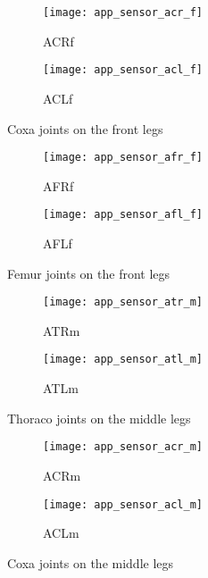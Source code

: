 \begin{figure}[H]
\centering
\begin{subfigure}{0.48\textwidth}
  \centering
  \texttt{[image: app\_sensor\_acr\_f]}
  \caption{ACRf}
  \label{fig:app_acr_f}
\end{subfigure}
\begin{subfigure}{0.48\textwidth}
  \centering
  \texttt{[image: app\_sensor\_acl\_f]}
  \caption{ACLf}
  \label{fig:app_acl_f}
\end{subfigure}
\caption{Coxa joints on the front legs}
\label{fig:app_ac_f}
\end{figure}

\begin{figure}[H]
\centering
\begin{subfigure}{0.48\textwidth}
  \centering
  \texttt{[image: app\_sensor\_afr\_f]}
  \caption{AFRf}
  \label{fig:app_afr_f}
\end{subfigure}
\begin{subfigure}{0.48\textwidth}
  \centering
  \texttt{[image: app\_sensor\_afl\_f]}
  \caption{AFLf}
  \label{fig:app_afl_f}
\end{subfigure}
\caption{Femur joints on the front legs}
\label{fig:app_af_f}
\end{figure}

\begin{figure}[H]
\centering
\begin{subfigure}{0.48\textwidth}
  \centering
  \texttt{[image: app\_sensor\_atr\_m]}
  \caption{ATRm}
  \label{fig:app_atr_m}
\end{subfigure}
\begin{subfigure}{0.48\textwidth}
  \centering
  \texttt{[image: app\_sensor\_atl\_m]}
  \caption{ATLm}
  \label{fig:app_atl_m}
\end{subfigure}
\caption{Thoraco joints on the middle legs}
\label{fig:app_at_m}
\end{figure}

\begin{figure}[H]
\centering
\begin{subfigure}{0.48\textwidth}
  \centering
  \texttt{[image: app\_sensor\_acr\_m]}
  \caption{ACRm}
  \label{fig:app_acr_m}
\end{subfigure}
\begin{subfigure}{0.48\textwidth}
  \centering
  \texttt{[image: app\_sensor\_acl\_m]}
  \caption{ACLm}
  \label{fig:app_acl_m}
\end{subfigure}
\caption{Coxa joints on the middle legs}
\label{fig:app_ac_m}
\end{figure}

